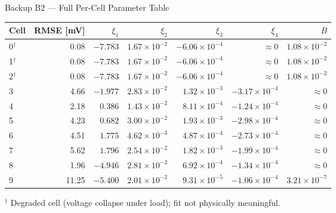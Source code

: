 \documentclass[aspectratio=169,11pt]{beamer}
\begin{document}
\begin{frame}{Backup B2 --- Full Per-Cell Parameter Table}
    \scriptsize
    \centering
    \begin{tabular}{lrrrrrr}
        \toprule
        Cell & RMSE [mV] & $\xi_1$ & $\xi_2$ & $\xi_3$ & $\xi_4$ & $B$ \\
        \midrule
        0$^\dagger$ & 0.08 & $-7.783$ & $1.67\!\times\!10^{-2}$ & $-6.06\!\times\!10^{-4}$ & $\approx0$ & $1.08\!\times\!10^{-2}$ \\
        1$^\dagger$ & 0.08 & $-7.783$ & $1.67\!\times\!10^{-2}$ & $-6.06\!\times\!10^{-4}$ & $\approx0$ & $1.08\!\times\!10^{-2}$ \\
        2$^\dagger$ & 0.08 & $-7.783$ & $1.67\!\times\!10^{-2}$ & $-6.06\!\times\!10^{-4}$ & $\approx0$ & $1.08\!\times\!10^{-2}$ \\
        3 &  4.66 & $-1.977$ & $2.83\!\times\!10^{-2}$ & $1.32\!\times\!10^{-3}$ & $-3.17\!\times\!10^{-4}$ & $\approx0$ \\
        4 &  2.18 & $ 0.386$ & $1.43\!\times\!10^{-2}$ & $8.11\!\times\!10^{-4}$ & $-1.24\!\times\!10^{-4}$ & $\approx0$ \\
        5 &  4.23 & $ 0.682$ & $3.00\!\times\!10^{-2}$ & $1.93\!\times\!10^{-3}$ & $-2.98\!\times\!10^{-4}$ & $\approx0$ \\
        6 &  4.51 & $ 1.775$ & $4.62\!\times\!10^{-3}$ & $4.87\!\times\!10^{-4}$ & $-2.73\!\times\!10^{-4}$ & $\approx0$ \\
        7 &  5.62 & $ 1.796$ & $2.54\!\times\!10^{-2}$ & $1.82\!\times\!10^{-3}$ & $-1.99\!\times\!10^{-4}$ & $\approx0$ \\
        8 &  1.96 & $-4.946$ & $2.81\!\times\!10^{-2}$ & $6.92\!\times\!10^{-4}$ & $-1.34\!\times\!10^{-4}$ & $\approx0$ \\
        9 & 11.25 & $-5.400$ & $2.01\!\times\!10^{-2}$ & $9.31\!\times\!10^{-5}$ & $-1.06\!\times\!10^{-4}$ & $3.21\!\times\!10^{-7}$ \\
        \bottomrule
    \end{tabular}
    \vspace{0.3em}\par
    $^\dagger$ Degraded cell (voltage collapse under load); fit not physically meaningful.
\end{frame}
\end{document}
